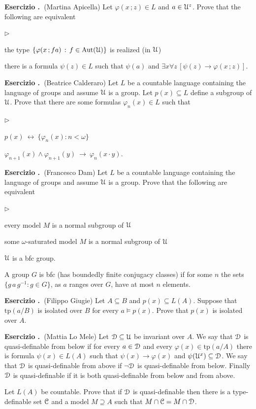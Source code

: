 \documentclass[10pt]{article}
\def\phi{\varphi}
\def\C{\EuScript C}
\def\D{\EuScript D}
\def\U{\EuScript U}
\def\E{\exists}
\def\A{\forall}
\def\imp{\rightarrow}
\def\iff{\leftrightarrow}
\def\Aut{\textrm{Aut}}
\def\tp{\textrm{tp}}
\newcommand{\labella}[1]{{\sf\footnotesize #1}\hfill}
\renewenvironment{itemize}
  {\begin{list}{$\triangleright$}{%
   \setlength{\parskip}{0mm}
   \setlength{\topsep}{0mm}
   \setlength{\rightmargin}{0mm}
   \setlength{\listparindent}{0mm}
   \setlength{\itemindent}{0mm}
   \setlength{\labelwidth}{3ex}
   \setlength{\itemsep}{0mm}
   \setlength{\parsep}{0mm}
   \setlength{\partopsep}{0mm}
   \setlength{\labelsep}{1ex}
   \setlength{\leftmargin}{\labelwidth+\labelsep}
   \let\makelabel\labella}}{%
   \vspace*{-.3\baselineskip}
  \end{list}}
\newcounter{ex}
\newenvironment{exercise}{\bigskip\addtocounter{ex}{1}\textbf{Esercizio \theex.\ }}{}
\begin{document}
\begin{exercise}(Martina Apicella)
  Let $\phi(x\,;z)\in L$ and $a\in\U^z$.
  Prove that the following are equivalent
  \begin{itemize}
  \item[1.] the type $\{\phi(x\,;fa)\,:\,f\in\Aut(\U)\}$ is realized (in $\U$)
  \item[2.] there is a formula $\psi(z)\in L$ such that  $\psi(a)$ and $\E x\A z\,[\psi(z)\imp\phi(x\,;z)]$.
  \end{itemize}  
\end{exercise}

\begin{exercise}(Beatrice Calderaro)
  Let $L$ be a countable language containing the language of groups and assume $\U$ is a group.
  Let $p(x)\subseteq L$ define a subgroup of $\U$.
  Prove that there are some formulas $\phi_n(x)\in L$ such that 
  \begin{itemize}
  \item[1.] $p(x)\ \iff\ \{\phi_n(x):n<\omega\}$
  \item[2.] $\phi_{n+1}(x)\wedge\phi_{n+1}(y)\ \imp\ \phi_n(x\cdot y)$.
  \end{itemize}
\end{exercise}

\begin{exercise}(Francesco Dam)
  Let $L$ be a countable language containing the language of groups and assume $\U$ is a group.
  Prove that the following are equivalent
  \begin{itemize}
    \item[1.] every model $M$ is a normal subgroup of $\U$
    \item[2.] some $\omega$-saturated model $M$ is a normal subgroup of $\U$
    \item[3.] $\U$ is a {\sc bfc} group.
  \end{itemize}
  A group $G$ is {\sc bfc} (has boundedly finite conjugacy classes) if for some $n$ the sets $\{g\,a\,g^{-1}:g\in G\}$, as $a$ ranges over $G$, have at most $n$ elements. 
\end{exercise}

\begin{exercise}(Filippo Giugie)
  Let $A\subseteq B$ and $p(x)\subseteq L(A)$. 
  Suppose that $\tp(a/B)$ is isolated over $B$ for every $a\models p(x)$.
  Prove that $p(x)$ is isolated over $A$.
\end{exercise}

\begin{exercise}(Mattia Lo Mele)
   Let $\D\subseteq\U$ be invariant over $A$.
   We say that $\D$ is quasi-definable from below if for every $a\in\D$ and every $\phi(x)\in\tp(a/A)$ there is formula $\psi(x)\in L(A)$ such that $\psi(x)\imp\phi(x)$ and $\psi(\U^x)\subseteq\D$.
   We say that $\D$ is quasi-definable from above if $\neg\D$ is quasi-definable from below.
   Finally $\D$ is quasi-definable if it is both quasi-definable from below and from above.

   Let $L(A)$ be countable. 
   Prove that if $\D$ is quasi-definable then there is a type-definable set $\C$ and a model $M\supseteq A$ such that $M\cap\C=M\cap\D$.
\end{exercise}
\end{document}
